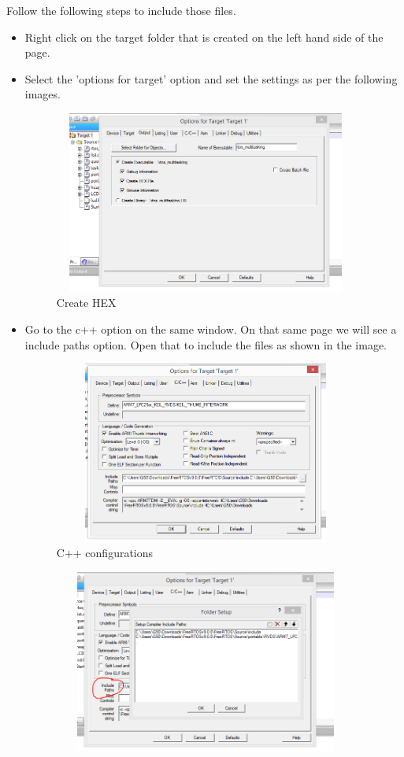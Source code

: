 \documentclass[11pt,a4paper]{book}
\begin{document}
\begin{enumerate}
Follow the following steps to include those files.
\begin{itemize}
	\item Right click on the target folder that is created on the left hand side of the page.
	\item Select the 'options for target' option and set the settings as per the following images.
	\begin{figure}[h]
		\centering
		\includegraphics[width=10cm,height=6cm]{Capture.PNG}
		\caption{Create HEX}
	\end{figure}
\item Go to the c++ option on the same window. On that same page we will see a include paths option. Open that to include the files as shown in the image.
\begin{figure}[H]
	\centering
	\includegraphics[width=10cm,height=6cm]{c++.PNG}
	\caption{C++ configurations}
\end{figure}
\begin{figure}[H]
	\centering
	\includegraphics[width=10cm,height=6cm]{c++foldersetup.PNG}

\end{figure}
\end{itemize}
\end{enumerate}
\end{document}
